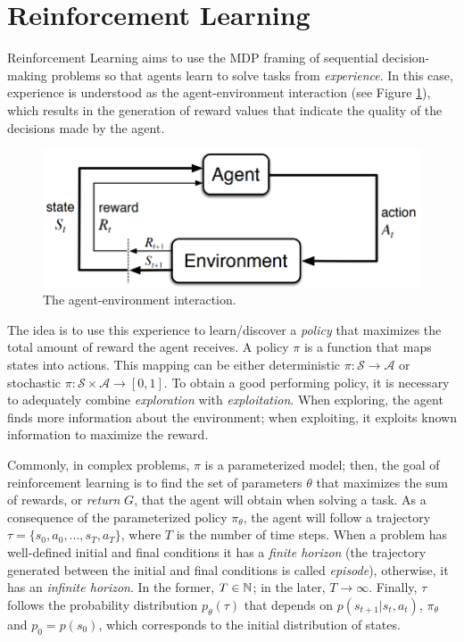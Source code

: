\section{Reinforcement Learning \cite{sutton2018reinforcement, kober2013reinforcement}}
Reinforcement Learning aims to use the MDP framing of sequential decision-making problems so that agents learn to solve tasks from \emph{experience}. In this case, experience is understood as the agent-environment interaction (see Figure \ref{fig:agent-environment}), which results in the generation of reward values that indicate the quality of the decisions made by the agent. 

\begin{figure}[h]
    \centering
    \includegraphics[width=0.7\linewidth]{imagenes/cap1/agent_environment.png}
    \caption{The agent-environment interaction.\protect\footnotemark}
    \label{fig:agent-environment}
\end{figure}

The idea is to use this experience to learn/discover a \emph{policy} that maximizes the total amount of reward the agent receives. A policy $\pi$ is a function that maps states into actions. This mapping can be either deterministic $\pi: \mathcal{S} \to \mathcal{A}$ or stochastic $\pi: \mathcal{S} \times \mathcal{A} \to [0,1]$. To obtain a good performing policy, it is necessary to adequately combine \emph{exploration} with \emph{exploitation}. When exploring, the agent finds more information about the environment; when exploiting, it exploits known information to maximize the reward.

Commonly, in complex problems, $\pi$ is a parameterized model; then, the goal of reinforcement learning is to find the set of parameters $\theta$ that maximizes the sum of rewards, or \emph{return} $G$, that the agent will obtain when solving a task. As a consequence of the parameterized policy $\pi_{\theta}$, the agent will follow a trajectory $\tau = \{s_{0}, a_{0},...,s_{T}, a_{T}\}$, where $T$ is the number of time steps. When a problem has well-defined initial and final conditions it has a \emph{finite horizon} (the trajectory generated between the initial and final conditions is called \emph{episode}), otherwise, it has an \emph{infinite horizon}. In the former, $T \in \mathbb{N}$; in the later, $T \to \infty$. Finally, $\tau$ follows the probability distribution $p_{\theta}(\tau)$ that depends on $p(s_{t+1}|s_{t}, a_{t})$, $\pi_{\theta}$ and $p_{0}=p(s_{0})$, which corresponds to the initial distribution of states.

